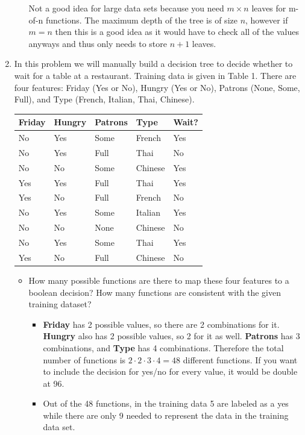 \documentclass[listings, listings-bw, listings-color, listings-sv]{article}
\begin{document}
\begin{enumerate}
\begin{itemize}
Not a good idea for large data sets because you need $m\times n$ leaves for m-of-n functions. The maximum depth of the tree is of size $n$, however if $m=n$ then this is a good idea as it would have to check all of the values anyways and thus only needs to store $n+1$ leaves.
\end{itemize}

\item In this problem we will manually build a decision tree to decide whether to wait for a table at a restaurant.  Training data is given in Table 1.  There are four features: Friday (Yes or No), Hungry (Yes or No), Patrons (None, Some, Full), and Type (French, Italian, Thai, Chinese).
\begin{center}
\begin{tabular}{lllll}
\hline
Friday & Hungry & Patrons & Type & Wait?\\
\hline
No & Yes & Some & French & Yes\\
No & Yes & Full & Thai & No\\
No & No & Some & Chinese & Yes\\
Yes & Yes & Full & Thai & Yes\\
Yes & No & Full & French & No\\
No & Yes & Some & Italian & Yes\\
No & No & None & Chinese & No\\
No & Yes & Some & Thai & Yes\\
Yes & No & Full & Chinese & No\\
\hline
\end{tabular}
\end{center}
\begin{itemize}
\item How many possible functions are there to map these four features to a boolean decision? How many functions are consistent with the given training dataset?
\begin{itemize}
\item \textbf{Friday} has 2 possible values, so there are 2 combinations for it. \textbf{Hungry} also has 2 possible values, so 2 for it as well. \textbf{Patrons} has 3 combinations, and \textbf{Type} has 4 combinations. Therefore the total number of functions is $2\cdot 2\cdot 3\cdot 4 = 48$ different functions. If you want to include the decision for yes/no for every value, it would be double at 96.
\item Out of the 48 functions, in the training data 5 are labeled as a yes while there are only 9 needed to represent the data in the training data set.
\end{itemize}


\end{itemize}
\end{enumerate}
\end{document}
